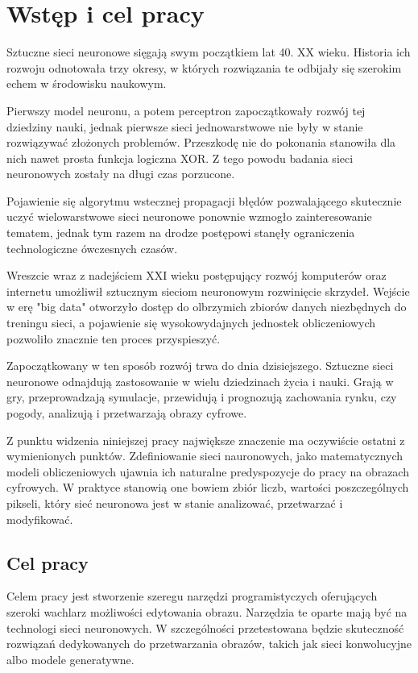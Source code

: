 \section{Wstęp i cel pracy}
  Sztuczne sieci neuronowe sięgają swym początkiem lat 40. XX wieku.
  Historia ich rozwoju odnotowała trzy okresy, w których rozwiązania te
  odbijały się szerokim echem w środowisku naukowym.

  Pierwszy model neuronu, a potem perceptron zapoczątkowały
  rozwój tej dziedziny nauki, jednak pierwsze sieci jednowarstwowe nie były w
  stanie rozwiązywać złożonych problemów. Przeszkodę nie do pokonania stanowiła
  dla nich nawet prosta funkcja logiczna XOR. Z tego powodu badania sieci
  neuronowych zostały na długi czas porzucone.


  Pojawienie się algorytmu wstecznej propagacji błędów
  pozwalającego skutecznie uczyć wielowarstwowe sieci neuronowe ponownie
  wzmogło zainteresowanie tematem, jednak tym razem na drodze postępowi stanęły
  ograniczenia technologiczne ówczesnych czasów.


  Wreszcie wraz z nadejściem XXI wieku postępujący rozwój
  komputerów oraz internetu umożliwił sztucznym sieciom neuronowym rozwinięcie
  skrzydeł. Wejście w erę "big data" otworzyło dostęp do olbrzymich zbiorów
  danych niezbędnych do treningu sieci, a pojawienie się wysokowydajnych
  jednostek obliczeniowych pozwoliło znacznie ten proces przyspieszyć.


  Zapoczątkowany w ten sposób rozwój trwa do dnia dzisiejszego.
  Sztuczne sieci neuronowe odnajdują zastosowanie w wielu dziedzinach życia i
  nauki. Grają w gry, przeprowadzają symulacje, przewidują i prognozują
  zachowania rynku, czy pogody, analizują i przetwarzają obrazy cyfrowe.


  Z punktu widzenia niniejszej pracy największe znaczenie ma
  oczywiście ostatni z wymienionych punktów. Zdefiniowanie sieci nauronowych,
  jako matematycznych modeli obliczeniowych ujawnia ich naturalne predyspozycje
  do pracy na obrazach cyfrowych. W praktyce stanowią one bowiem zbiór liczb,
  wartości poszczególnych pikseli, który sieć neuronowa jest w stanie
  analizować, przetwarzać i modyfikować.

  \subsection{Cel pracy}
    Celem pracy jest stworzenie szeregu narzędzi programistyczych
    oferujących szeroki wachlarz możliwości edytowania obrazu. Narzędzia te
    oparte mają być na technologi sieci neuronowych. W szczególności
    przetestowana będzie skuteczność rozwiązań dedykowanych do przetwarzania
    obrazów, takich jak sieci konwolucyjne albo modele generatywne.

